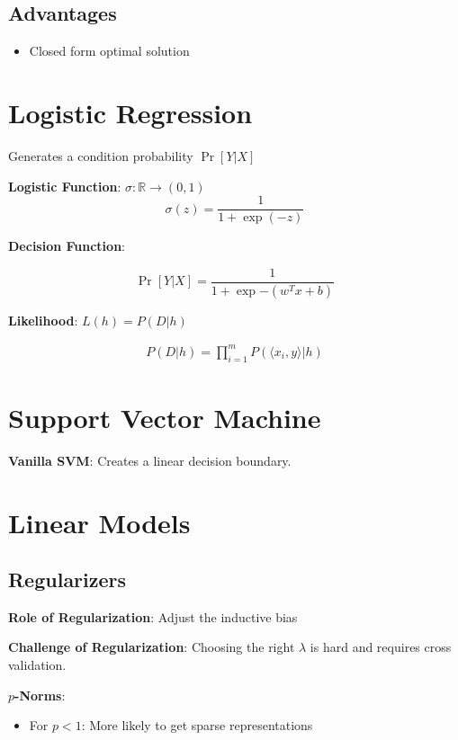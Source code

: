 \documentclass[10pt]{article}
\newcommand{\colortext}[2]{{\color{#1} #2}}
\newcommand{\red}[1]{\colortext{red}{#1}}
\begin{document}
\begin{multicols}{3}
  \subsection{Advantages}

  \begin{itemize}
    \item Closed form optimal solution

  \end{itemize}

  \section{Logistic Regression}

  Generates a condition probability $\Pr[Y\vert X]$

  \textbf{Logistic Function}: $\sigma: \mathbb{R} \rightarrow (0,1) $
  \[ \sigma(z) = \frac{1}{1+\exp(-z)} \]

  \textbf{Decision Function}:

  \[ \Pr[Y\vert X] = \frac{1}{1+\exp{-(w^{T}x + b)}} \]

  \textbf{Likelihood}: $L(h) = P(D\vert h)$

  \begin{align*}
    P(D\vert h) = \prod_{i=1}^m P(\langle x_i,y\rangle \vert h)
  \end{align*}

  \section{Support Vector Machine}

  \textbf{Vanilla SVM}: Creates a linear decision boundary.

  \section{Linear Models}

  \subsection{Regularizers}

  \textbf{Role of Regularization}: \red{Adjust the inductive bias}

  \vspace{6pt}\textbf{Challenge of Regularization}: Choosing the right $\lambda$ is hard and requires cross validation.

  \textbf{$p$-Norms}:
  \begin{itemize}
    \item For $p<1$: More likely to get sparse representations
  \end{itemize}


\end{multicols}
\end{document}
